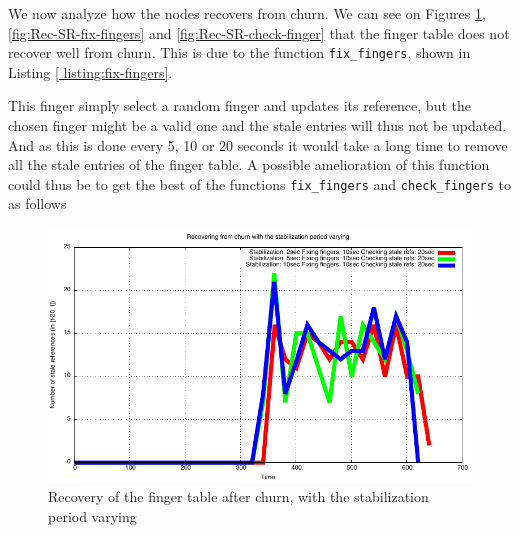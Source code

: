\documentclass[a4paper, 11pt]{article}
\theoremstyle{plain}
\theoremstyle{definition}
\begin{document}
    

    We now analyze how the nodes recovers from churn. We can see on Figures \ref{fig:Rec-SR-stab},
    \ref{fig:Rec-SR-fix-fingers} and \ref{fig:Rec-SR-check-finger} that the finger table does not recover well
    from churn. This is due to the function \texttt{fix\_fingers}, shown in Listing \ref{
    listing:fix-fingers}. 

    

    This finger simply select a random finger and updates its reference, but the chosen finger might be a
    valid one and the stale entries will thus not be updated. And as this is done every 5, 10 or 20 seconds it
    would take a long time to remove all the stale entries of the finger table. A possible amelioration of
    this function could thus be to get the best of the functions \texttt{fix\_fingers} and \texttt{check\_fingers} to as follows
    
    

    \begin{figure}[h]
      \centering
      \includegraphics{plots/Recovery-SR-stabilization.pdf}
      \caption{Recovery of the finger table after churn, with the stabilization period varying}
      \label{fig:Rec-SR-stab}
    \end{figure}
    
\end{document}
